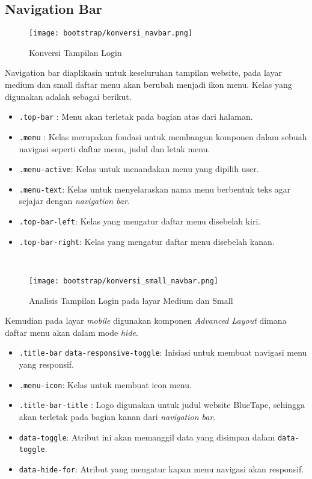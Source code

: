 \subsection{Navigation Bar}
\begin{figure} [H]
	\centering  
	\texttt{[image: bootstrap/konversi\_navbar.png]}  
	\caption{Konversi Tampilan Login} 
\end{figure}
Navigation bar diaplikasin untuk keseluruhan tampilan website, pada layar medium dan small daftar menu akan berubah menjadi ikon menu.
Kelas yang digunakan adalah sebagai berikut.
\begin{itemize}
	\item \texttt{.top-bar}	: Menu akan terletak pada bagian atas dari halaman.	
	\item \texttt{.menu}	: Kelas merupakan fondasi untuk membangun komponen dalam sebuah navigasi seperti daftar menu, judul dan letak menu.
	\item \texttt{.menu-active}: Kelas untuk menandakan menu yang dipilih user.
	\item \texttt{.menu-text}: Kelas untuk menyelaraskan nama menu berbentuk teks agar sejajar dengan \textit{navigation bar}.	
	\item \texttt{.top-bar-left}: Kelas yang mengatur daftar menu disebelah kiri.
	\item \texttt{.top-bar-right}: Kelas yang mengatur daftar menu disebelah kanan.
\end{itemize} \noindent \\
\begin{figure} [H]
	\centering  
	\texttt{[image: bootstrap/konversi\_small\_navbar.png]}  
	\caption{Analisis Tampilan Login pada layar Medium dan Small} 
\end{figure}
Kemudian pada layar \textit{mobile} digunakan komponen \textit{Advanced Layout} dimana daftar menu akan dalam mode \textit{hide}.
\begin{itemize}	
	\item \texttt{.title-bar} \texttt{data-responsive-toggle}: Inisiasi untuk membuat navigasi menu yang responsif. 
	\item \texttt{.menu-icon}: Kelas untuk membuat icon menu.
	\item \texttt{.title-bar-title}	: Logo digunakan untuk judul website BlueTape, sehingga akan terletak pada bagian kanan dari \textit{navigation bar}.
	\item \texttt{data-toggle}: Atribut ini akan memanggil data yang disimpan dalam \texttt{data-toggle}.	
	\item \texttt{data-hide-for}: Atribut yang mengatur kapan menu navigasi akan responsif.
\end{itemize}

